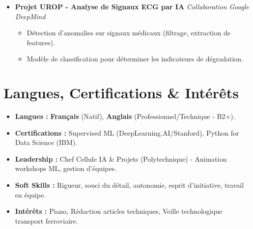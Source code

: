 \documentclass[a4paper,11pt]{article}
\begin{document}
\begin{itemize}[leftmargin=*, label={}]
\item \textbf{Projet UROP - Analyse de Signaux ECG par IA} \hfill \textit{Collaboration Google DeepMind}
\vspace{-2pt}
    \begin{itemize}[leftmargin=0.4cm, nosep, label=\tiny$\bullet$]
        \item \small{Détection d'anomalies sur signaux médicaux (filtrage, extraction de features).}
        \item \small{Modèle de classification pour déterminer les indicateurs de dégradation.}
    \end{itemize}

\end{itemize}

\section{Langues, Certifications \& Intérêts}
\begin{itemize}[leftmargin=*, nosep]
    \item \textbf{Langues :} \textbf{Français} (Natif), \textbf{Anglais} (Professionnel/Technique - B2+).
    \item \textbf{Certifications :} Supervised ML (DeepLearning.AI/Stanford), Python for Data Science (IBM).
    \item \textbf{Leadership :} Chef Cellule IA \& Projets (Polytechnique) - Animation workshops ML, gestion d'équipes.
    \item \textbf{Soft Skills :} Rigueur, souci du détail, autonomie, esprit d'initiative, travail en équipe.
    \item \textbf{Intérêts :} Piano, Rédaction articles techniques, Veille technologique transport ferroviaire.
\end{itemize}
\end{document}
